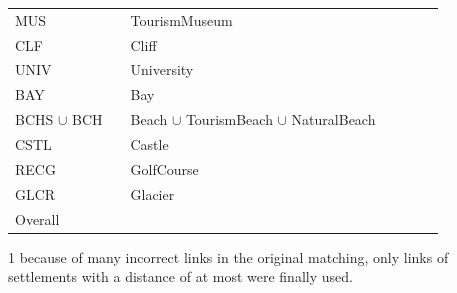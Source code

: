 \begin{table}[ht]
\begin{threeparttable}
\begin{tabulary}{\textwidth}{LRLRRRR}
MUS						&		&TourismMuseum			&		&		&	&\\
CLF						&		&Cliff				&		&		&	&\\
UNIV						&		&University			&		&		&	&\\
BAY						&		&Bay				&		&		&	&\\
BCHS $\cup$ BCH					&		&Beach $\cup$ TourismBeach $\cup$ NaturalBeach	
													&		&		&	&\\
CSTL						&		&Castle				&		&		&	&\\
RECG						&		&GolfCourse			&		&		&	&\\
GLCR						&		&Glacier			&		&		&	&\\
\midrule
Overall			&		&				&				&		&	&\\
\bottomrule
\end{tabulary}
\begin{tablenotes}
\item [1] because of many incorrect links in the original matching, only links of settlements with a distance of at most  were finally used.

\end{tablenotes}
\end{threeparttable}
\end{table}
